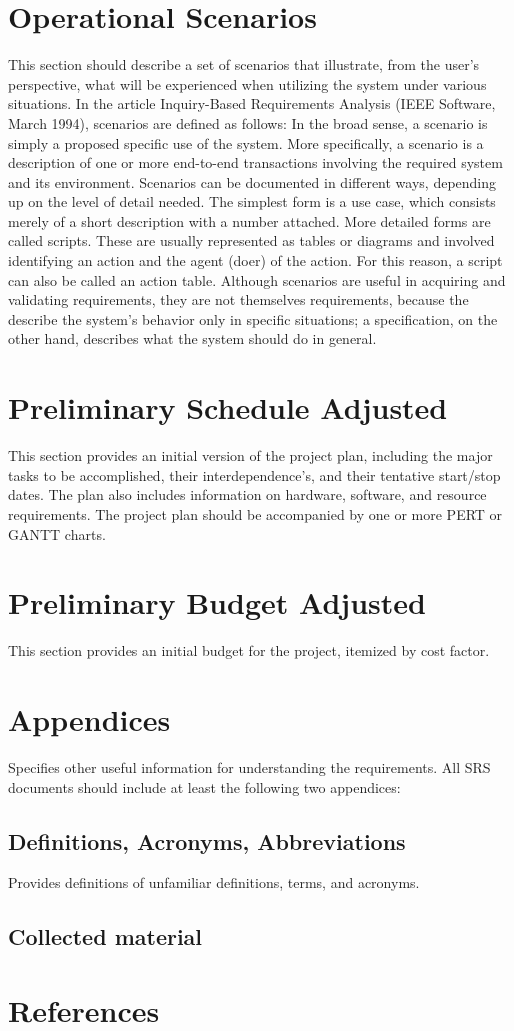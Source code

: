 \documentclass[12pt]{article}
\begin{document}
\section{Operational Scenarios}
This section should describe a set of scenarios that illustrate, from the user's perspective, what will be experienced when utilizing the system under various situations. 
In the article Inquiry-Based Requirements Analysis (IEEE Software, March 1994), scenarios are defined as follows: 
In the broad sense, a scenario is simply a proposed specific use of the system. More specifically, a scenario is a description of one or more end-to-end transactions involving the required system and its environment. Scenarios can be documented in different ways, depending up on the level of detail needed. The simplest form is a use case, which consists merely of a short description with a number attached. More detailed forms are called scripts. These are usually represented as tables or diagrams and involved identifying an action and the agent (doer) of the action. For this reason, a script can also be called an action table. 
Although scenarios are useful in acquiring and validating requirements, they are not themselves requirements, because the describe the system's behavior only in specific situations; a specification, on the other hand, describes what the system should do in general. 

\section{Preliminary Schedule Adjusted}
This section provides an initial version of the project plan, including the major tasks to be accomplished, their interdependence's, and their tentative start/stop dates. The plan also includes information on hardware, software, and  resource requirements. 
The project plan should be accompanied by one or more PERT or GANTT charts. 
\section{Preliminary Budget Adjusted}
This section provides an initial budget for the project, itemized by cost factor. 
\section{Appendices}
Specifies other useful information for understanding the requirements. All SRS documents should include at least the following two appendices: 
\subsection{Definitions, Acronyms, Abbreviations}
Provides definitions of unfamiliar definitions, terms, and acronyms. 
\subsection{Collected material}

\section {References}



\end{document}
